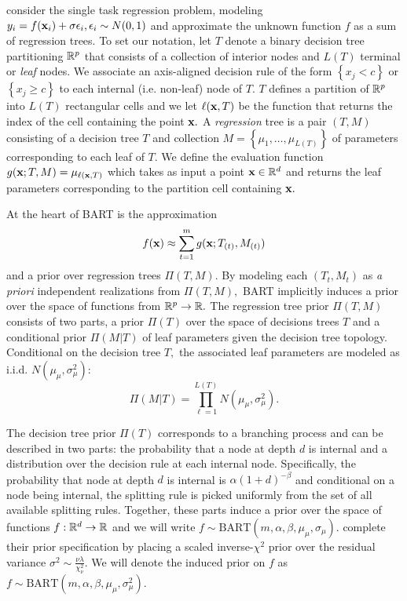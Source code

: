 \documentclass[12pt]{article}
\begin{document}
\citet{Chipman2010} consider the single task regression problem, modeling $y_{i} = f(\mathbf{x}_{i}) + \sigma\epsilon_{i}, \epsilon_{i} \sim N(0,1)$ and approximate the unknown function $f$ as a sum of regression trees.
To set our notation, let $T$ denote a binary decision tree partitioning $\mathbb{R}^{p}$ that consists of a collection of interior nodes and $L(T)$ terminal or \textit{leaf} nodes. 
We associate an axis-aligned decision rule of the form $\left\{x_{j} < c \right\}$ or $\left\{x_{j} \geq c \right\}$ to each internal (i.e. non-leaf) node of $T.$
$T$ defines a partition of $\mathbb{R}^{p}$ into $L(T)$ rectangular cells and we let $\ell(\mathbf{x},T)$ be the function that returns the index of the cell containing the point $\mathbf{x}.$
A \textit{regression} tree is a pair $(T,M)$ consisting of a decision tree $T$ and collection $M = \left\{\mu_{1}, \ldots, \mu_{L(T)}\right\}$ of parameters corresponding to each leaf of $T.$
We define the evaluation function $g(\mathbf{x}; T,M) = \mu_{\ell(\mathbf{x},T)}$ which takes as input a point $\mathbf{x} \in \mathbb{R}^{d}$ and returns the leaf parameters corresponding to the partition cell containing $\mathbf{x}.$

At the heart of BART is the approximation
$$
f(\mathbf{x}) \approx \sum_{t = 1}^{m}{g(\mathbf{x}; T_{(t)}, M_{(t)})}
$$
and a prior over regression trees $\Pi(T,M).$
By modeling each $(T_{t}, M_{t})$ as \textit{a priori} independent realizations from $\Pi(T,M),$ BART implicitly induces a prior over the space of functions from $\mathbb{R}^{p} \rightarrow \mathbb{R}.$
The regression tree prior $\Pi(T,M)$ consists of two parts, a prior $\Pi(T)$ over the space of decisions trees $T$ and a conditional prior $\Pi(M | T)$ of leaf parameters given the decision tree topology.
Conditional on the decision tree $T,$ the associated leaf parameters are modeled as i.i.d. $N(\mu_{\mu}, \sigma^{2}_{\mu}):$ 
$$
\Pi(M | T) = \prod_{\ell = 1}^{L(T)}N(\mu_{\mu}, \sigma^{2}_{\mu}).
$$


The decision tree prior $\Pi(T)$ corresponds to a branching process and can be described in two parts: the probability that a node at depth $d$ is internal and a distribution over the decision rule at each internal node.
Specifically, the probability that node at depth $d$ is internal is $\alpha(1 + d)^{-\beta}$ and conditional on a node being internal, the splitting rule is picked uniformly from the set of all available splitting rules.
Together, these parts induce a prior over the space of functions $f: \mathbb{R}^{d} \rightarrow \mathbb{R}$ and we will write $f \sim \text{BART}(m, \alpha, \beta, \mu_{\mu}, \sigma_{\mu}).$
\citet{Chipman2010} complete their prior specification by placing a scaled inverse-$\chi^{2}$ prior over the residual variance $\sigma^{2} \sim \frac{\nu\lambda}{\chi^{2}_{\nu}}.$
We will denote the induced prior on $f$ as $f \sim \text{BART}(m, \alpha, \beta, \mu_{\mu}, \sigma^{2}_{\mu}).$ 
\end{document}
